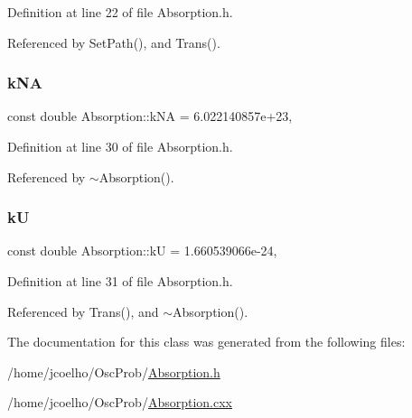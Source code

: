 Definition at line 22 of file Absorption.\+h.



Referenced by Set\+Path(), and Trans().

\mbox{\label{classOscProb_1_1Absorption_a4b3f52bb9c7fffbd55dc9d345375d9b0}} 
\subsubsection{\texorpdfstring{k\+NA}{kNA}}
{\footnotesize\ttfamily const double Absorption\+::k\+NA = 6.\+022140857e+23\hspace{0.3cm}{\ttfamily [static]}, {\ttfamily [protected]}}



Definition at line 30 of file Absorption.\+h.



Referenced by $\sim$\+Absorption().

\mbox{\label{classOscProb_1_1Absorption_ab33e87a30b5761dbf7fca55ee9cb58a7}} 
\subsubsection{\texorpdfstring{kU}{kU}}
{\footnotesize\ttfamily const double Absorption\+::kU = 1.\+660539066e-\/24\hspace{0.3cm}{\ttfamily [static]}, {\ttfamily [protected]}}



Definition at line 31 of file Absorption.\+h.



Referenced by Trans(), and $\sim$\+Absorption().



The documentation for this class was generated from the following files\+:\begin{DoxyCompactItemize}
\item 
/home/jcoelho/\+Osc\+Prob/\hyperlink{Absorption_8h}{Absorption.\+h}\item 
/home/jcoelho/\+Osc\+Prob/\hyperlink{Absorption_8cxx}{Absorption.\+cxx}\end{DoxyCompactItemize}
